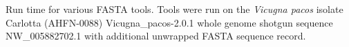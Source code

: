 Run time for various FASTA tools. Tools were run on the \textit{Vicugna pacos} isolate Carlotta (AHFN-0088) Vicugna\_pacos-2.0.1 whole genome shotgun sequence NW\_005882702.1 with additional unwrapped FASTA sequence record.
  
  